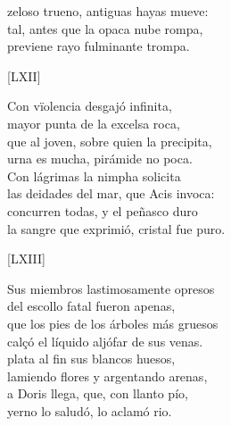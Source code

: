 \documentclass[11pt,a4paper,twoside]{article}
\begin{document}
zeloso trueno, antiguas hayas mueve:\\
tal, antes que la opaca nube rompa,\\
previene rayo fulminante trompa.\pend
\begin{center}
	[LXII]
\end{center}\pstart
Con vïolencia desgajó infinita,\\
mayor punta de la excelsa roca,\\
que al joven, sobre quien la precipita,\\
urna es mucha, pirámide no poca.\\
Con lágrimas la nimpha solicita\\
las deidades del mar, que Acis invoca:\\
concurren todas, y el peñasco duro\\
la sangre que exprimió, cristal fue puro.\pend
\begin{center}
	[LXIII]
\end{center}\pstart
Sus miembros lastimosamente opresos\\
del escollo fatal fueron apenas,\\
que los pies de los árboles más gruesos\\
calçó el líquido aljófar de sus venas.\\
 plata al fin sus blancos huesos,\\
lamiendo flores y argentando arenas,\\
a Doris llega, que, con llanto pío,\\
yerno lo saludó, lo aclamó rio.\pend
\endnumbering
\relax
\vfill
%
\end{document}
